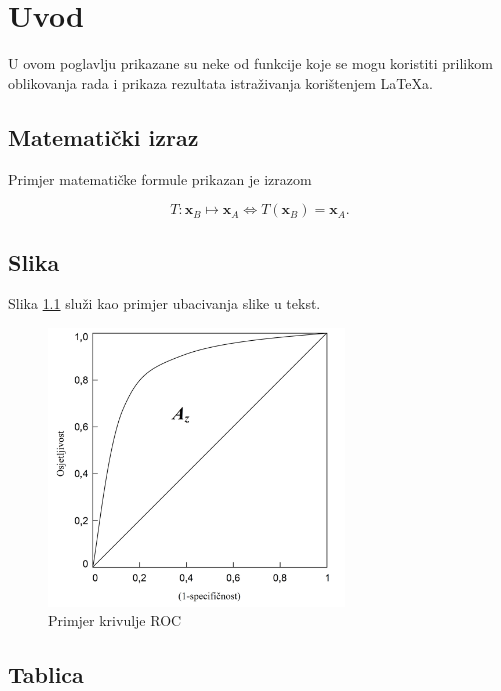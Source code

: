 \chapter{Uvod}

U ovom poglavlju prikazane su neke od funkcije koje se mogu koristiti prilikom
oblikovanja rada i prikaza rezultata istraživanja korištenjem \LaTeX a.

\section{Matematički izraz}


Primjer matematičke formule prikazan je izrazom

\begin{equation}
  T: \mathbf{x}_B \mapsto \mathbf{x}_A \Leftrightarrow T(\mathbf{x}_B) = \mathbf{x}_A.
  \label{eq:transformacija}
\end{equation}


\section{Slika}


Slika \ref{fig:roc_example} služi kao primjer ubacivanja slike u tekst.

\begin{figure}
  \centering
  \includegraphics[width=0.7\textwidth]{roc_example}
  \caption{Primjer krivulje ROC}
  \label{fig:roc_example}
\end{figure}


\section{Tablica}


